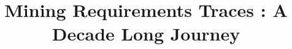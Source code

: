 \documentclass{report}
\begin{document}






%

\title{Mining Requirements Traces : A Decade Long Journey}
%
%
%
%
%
\end{document}
